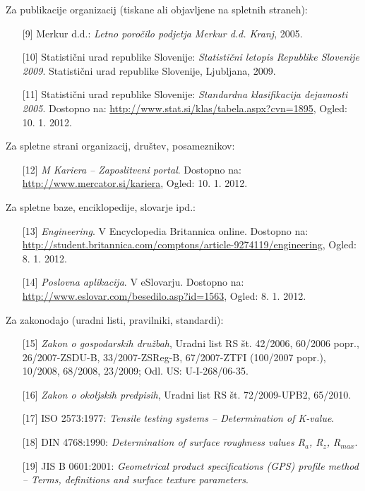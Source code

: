 Za publikacije organizacij (tiskane ali objavljene na spletnih straneh):
\begin{itemize}
	\item[{[9]}] {Merkur d.d.}: \emph{Letno poročilo podjetja Merkur d.d. Kranj}, 2005.
	\item[{[10]}] {Statistični urad republike Slovenije}: \emph{Statistični letopis Republike
		Slovenije 2009}. Statistični urad republike Slovenije, Ljubljana, 2009.
	\item[{[11]}] {Statistični urad republike Slovenije}: \emph{Standardna klasifikacija
		dejavnosti 2005}. Dostopno na:
	\url{http://www.stat.si/klas/tabela.aspx?cvn=1895}, Ogled: 10. 1. 2012.
\end{itemize}

Za spletne strani organizacij, društev, posameznikov:
\begin{itemize}
	\item[{[12]}] \emph{M Kariera – Zaposlitveni portal}. Dostopno na:
	\url{http://www.mercator.si/kariera}, Ogled: 10. 1. 2012.
\end{itemize}

Za spletne baze, enciklopedije, slovarje ipd.:
\begin{itemize}
	\item[{[13]}] \emph{Engineering}. V Encyclopedia Britannica online. Dostopno na:
	\url{http://student.britannica.com/comptons/article-9274119/engineering},
	Ogled: 8. 1. 2012.
	\item[{[14]}] \emph{Poslovna aplikacija}. V eSlovarju. Dostopno na:
	\url{http://www.eslovar.com/besedilo.asp?id=1563}, Ogled: 8. 1. 2012.
\end{itemize}

Za zakonodajo (uradni listi, pravilniki, standardi):
\begin{itemize}
	\item[{[15]}] \emph{Zakon o gospodarskih družbah}, {U}radni list RS št. 42/2006, 60/2006
	popr., 26/2007-ZSDU-B, 33/2007-ZSReg-B, 67/2007-ZTFI (100/2007 popr.),
	10/2008, 68/2008, 23/2009; Odl. US: U-I-268/06-35.
	\item[{[16]}] \emph{Zakon o okoljskih predpisih}, {U}radni list RS št. 72/2009-UPB2,
	65/2010.
	\item[{[17]}] {ISO 2573:1977}: \emph{Tensile testing systems – Determination of K-value}.
	\item[{[18]}] {DIN 4768:1990}: \emph{Determination of surface roughness values R$_a$, R$_z$,
		R$_{max}$}.
	\item[{[19]}] {JIS B 0601:2001}: \emph{Geometrical product specifications (GPS) profile
		method – Terms, definitions and surface texture parameters}.
\end{itemize}

